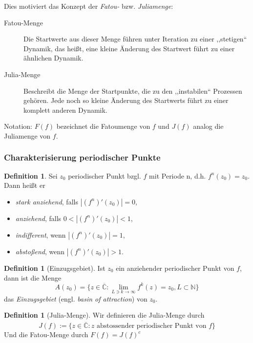 \documentclass{beamer}
\newcommand{\N}{\mathbb{N}}
\theoremstyle{definition}
\newcounter{foo}
\newtheorem{df}[foo]{Definition}
\begin{document}
\begin{frame}
Dies motiviert das Konzept der \emph{Fatou-} bzw. \emph{Juliamenge}:
\begin{description}
\item[Fatou-Menge] Die Startwerte aus dieser Menge führen unter Iteration zu einer ,,stetigen`` Dynamik, das heißt, eine kleine Änderung des Startwert führt zu einer ähnlichen Dynamik.
\item[Julia-Menge] Beschreibt die Menge der Startpunkte, die zu den ,,instabilen`` Prozessen gehören. Jede noch so kleine Änderung des Startwerts führt zu einer komplett anderen Dynamik.
\end{description} 
Notation: $F(f)$ bezeichnet die Fatoumenge von $f$ und $J(f)$ analog die Juliamenge von $f$.
\end{frame}

\begin{frame}
\frametitle{Charakterisierung periodischer Punkte}
\begin{df}
Sei $z_0$ periodischer Punkt bzgl. $f$ mit Periode n, d.h. $f^n(z_0)=z_0$. Dann heißt er
\begin{itemize}
\item \emph{stark anziehend}, falls $|(f^n)'(z_0)|=0$,
\item \emph{anziehend}, falls $0<|(f^n)'(z_0)|<1$,
\item \emph{indifferent}, wenn $|(f^n)'(z_0)|=1$,
\item \emph{abstoßend}, wenn $|(f^n)'(z_0)|>1$.
\end{itemize} 
\end{df}
\end{frame}

\begin{frame}
\begin{df}[Einzugsgebiet]
Ist $z_0$ ein anziehender periodischer Punkt von $f$, dann ist die Menge
\[
	A(z_0)=\{z\in \overline{\mathbb{C}}: \lim\limits_{L\ni k\to \infty} f^k(z)=z_0, L\subset \N\}
\]
das \emph{Einzugsgebiet} (engl. \emph{basin of attraction}) von $z_0$.
\end{df}
\end{frame}

\begin{frame}
\begin{df}[Julia-Menge]
Wir definieren die Julia-Menge durch
\[
J(f):=\overline{\{z\in \overline{\mathbb{C}}: z \text{ abstossender periodischer Punkt von $f$} \}}
\]
Und die Fatou-Menge durch $F(f)=J(f)^c$
\end{df}
\end{frame}
\end{document}
